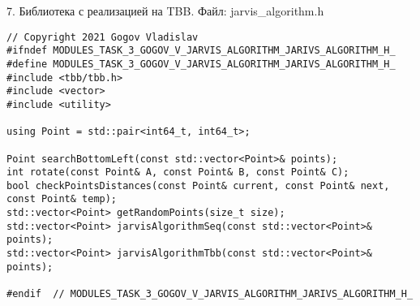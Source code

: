 \documentclass{report}
\begin{document}
\par 7. Библиотека с реализацией на TBB. Файл: jarvis\_algorithm.h
\begin{lstlisting}
// Copyright 2021 Gogov Vladislav
#ifndef MODULES_TASK_3_GOGOV_V_JARVIS_ALGORITHM_JARIVS_ALGORITHM_H_
#define MODULES_TASK_3_GOGOV_V_JARVIS_ALGORITHM_JARIVS_ALGORITHM_H_
#include <tbb/tbb.h>
#include <vector>
#include <utility>

using Point = std::pair<int64_t, int64_t>;

Point searchBottomLeft(const std::vector<Point>& points);
int rotate(const Point& A, const Point& B, const Point& C);
bool checkPointsDistances(const Point& current, const Point& next, const Point& temp);
std::vector<Point> getRandomPoints(size_t size);
std::vector<Point> jarvisAlgorithmSeq(const std::vector<Point>& points);
std::vector<Point> jarvisAlgorithmTbb(const std::vector<Point>& points);

#endif  // MODULES_TASK_3_GOGOV_V_JARVIS_ALGORITHM_JARIVS_ALGORITHM_H_
\end{lstlisting}
\end{document}

